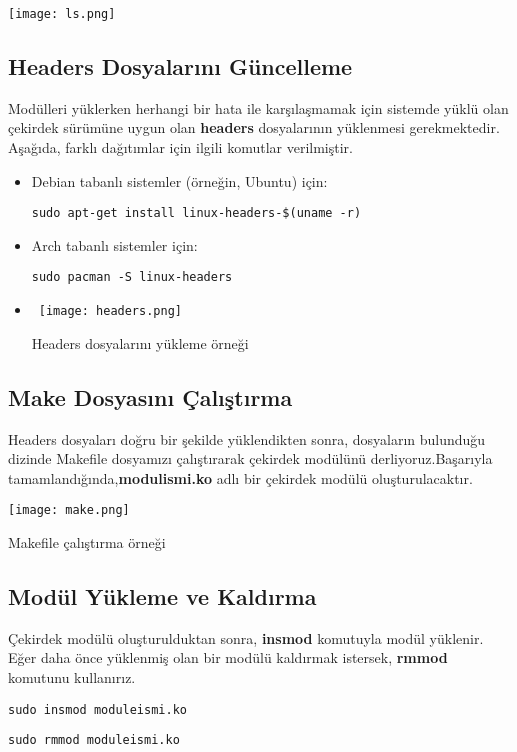 \documentclass[a4paper,12pt]{article}
\begin{document}
\texttt{[image: ls.png]}

\subsection{Headers Dosyalarını Güncelleme}
Modülleri yüklerken herhangi bir hata ile karşılaşmamak için sistemde yüklü olan çekirdek sürümüne uygun olan \textbf{headers} dosyalarının yüklenmesi gerekmektedir. Aşağıda, farklı dağıtımlar için ilgili komutlar verilmiştir.
\begin{itemize}
    \item Debian tabanlı sistemler (örneğin, Ubuntu) için:
    \begin{lstlisting}[language=shell, caption={Debian için }]
    sudo apt-get install linux-headers-$(uname -r)\end{lstlisting}
    \item Arch tabanlı sistemler için:
    \begin{lstlisting}[language=shell, caption={Arch için }]
    sudo pacman -S linux-headers\end{lstlisting}
    
    \item\ \texttt{[image: headers.png]}
    \caption{Headers dosyalarını yükleme örneği}
    \label{fig:ornek_resim}
\end{itemize}

\subsection{Make Dosyasını Çalıştırma}
Headers dosyaları doğru bir şekilde yüklendikten sonra, dosyaların bulunduğu dizinde Makefile dosyamızı çalıştırarak çekirdek modülünü derliyoruz.Başarıyla tamamlandığında,\textbf{modulismi.ko} adlı bir çekirdek modülü oluşturulacaktır.\par\vspace{1cm}
\texttt{[image: make.png]}
\caption{Makefile çalıştırma örneği}

\subsection{Modül Yükleme ve Kaldırma}
Çekirdek modülü oluşturulduktan sonra, \textbf{insmod} komutuyla modül yüklenir. Eğer daha önce yüklenmiş olan bir modülü kaldırmak istersek, \textbf{rmmod} komutunu kullanırız.
    \begin{lstlisting}[language=shell, caption={Modül yüklemek için }]
    sudo insmod moduleismi.ko\end{lstlisting}
    \begin{lstlisting}[language=shell, caption={Yüklü modülü kaldırmak için }]
    sudo rmmod moduleismi.ko\end{lstlisting}
\end{document}
